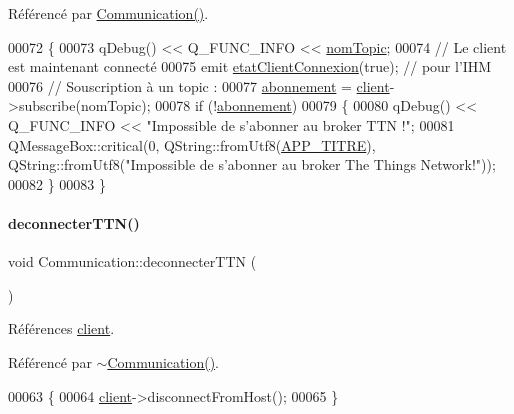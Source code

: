 Référencé par \hyperlink{class_communication_a7376830f5598b7e3c0eb4434a8a8766e}{Communication()}.


\begin{DoxyCode}
00072 \{
00073     qDebug() << Q\_FUNC\_INFO << \hyperlink{class_communication_a7d536b64ee7a5373047c292477d391d5}{nomTopic};
00074     \textcolor{comment}{// Le client est maintenant connecté}
00075     emit \hyperlink{class_communication_aa6100d6b2addece57f3e74c1140a3179}{etatClientConnexion}(\textcolor{keyword}{true}); \textcolor{comment}{// pour l'IHM}
00076     \textcolor{comment}{// Souscription à un topic :}
00077     \hyperlink{class_communication_af29011664fbb15b9fb41ce37b70a694f}{abonnement} = \hyperlink{class_communication_a59ae01a54d6c3fde6242c46d802b954b}{client}->subscribe(nomTopic);
00078     \textcolor{keywordflow}{if} (!\hyperlink{class_communication_af29011664fbb15b9fb41ce37b70a694f}{abonnement})
00079     \{
00080         qDebug() << Q\_FUNC\_INFO << \textcolor{stringliteral}{"Impossible de s'abonner au broker TTN !"};
00081         QMessageBox::critical(0, QString::fromUtf8(\hyperlink{parametres_8h_ace364d1ce44aa9f79bcff6e3752c4a5f}{APP\_TITRE}), QString::fromUtf8(\textcolor{stringliteral}{"Impossible de
       s'abonner au broker The Things Network!"}));
00082     \}
00083 \}
\end{DoxyCode}
\mbox{\label{class_communication_a8d0cc5c992a2b218a64f57429eea001b}} 
\paragraph{\texorpdfstring{deconnecter\+T\+T\+N()}{deconnecterTTN()}}
{\footnotesize\ttfamily void Communication\+::deconnecter\+T\+TN (\begin{DoxyParamCaption}{ }\end{DoxyParamCaption})}



Références \hyperlink{class_communication_a59ae01a54d6c3fde6242c46d802b954b}{client}.



Référencé par \hyperlink{class_communication_a75ba08ce908d45251e28e4c1db94e6f4}{$\sim$\+Communication()}.


\begin{DoxyCode}
00063 \{
00064     \hyperlink{class_communication_a59ae01a54d6c3fde6242c46d802b954b}{client}->disconnectFromHost();
00065 \}
\end{DoxyCode}
\mbox{\label{class_communication_ab0f5a47c2fc7dbca198bfab2c0ac65bb}} 
